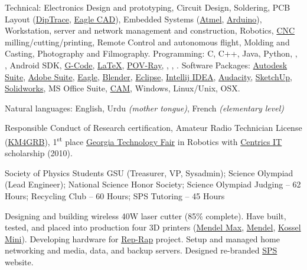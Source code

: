 \documentclass[10pt,a4paper]{article}
\begin{document}
\inlineheadsection  %
  {Technical:}
  {Electronics Design and prototyping, Circuit Design, Soldering, PCB Layout  (\href{http://diptrace.com/}{DipTrace}, \href{http://www.cadsoftusa.com/}{Eagle CAD}), Embedded Systems (\href{http://www.atmel.com/}{Atmel}, \href{http://www.arduino.cc/}{Arduino}), Workstation, server and network management and construction, Robotics, \href{http://en.wikipedia.org/wiki/Numerical_control}{CNC} milling/cutting/printing, Remote Control and autonomous flight, Molding and Casting, Photography and Filmography.
  }
  \vspace{0.5em}
  \inlineheadsection
  {Programming:}
  {C, C++, Java, Python, , , Android SDK, \href{http://en.wikipedia.org/wiki/G-code}{G-Code}, \href{http://www.latex-project.org}{\LaTeX}, \href{http://www.povray.org/}{POV-Ray}, , , .
  }
    \vspace{0.5em}
  \inlineheadsection
  {Software Packages:}
  {\href{http://www.autodesk.com/}{Autodesk Suite}, \href{http://www.adobe.com/}{Adobe Suite}, \href{http://www.cadsoftusa.com/}{Eagle}, \href{http://www.blender.org/}{Blender}, \href{https://www.eclipse.org/}{Eclipse}, \href{http://www.jetbrains.com/idea/}{Intellij IDEA}, \href{http://audacity.sourceforge.net/}{Audacity}, \href{http://www.sketchup.com/}{SketchUp}, \href{http://www.solidworks.com/}{Solidworks}, 
  MS Office Suite, \href{http://en.wikipedia.org/wiki/Computer-aided_manufacturing}{CAM},
  Windows,
  Linux/Unix,
  OSX.}
  
\vspace{0.5em}
\inlineheadsection
  {Natural languages:}
  {English, Urdu \emph{(mother tongue)}, French \emph{(elementary level)}}

\spacedhrule{1.6em}{-0.4em}

  {\href{https://www.citiprogram.org/}{} Responsible Conduct of Research certification, 
  	Amateur Radio Technician License (\href{http://wireless2.fcc.gov/UlsApp/UlsSearch/license.jsp?licKey=3657450}{KM4GRB}),
  1\textsuperscript{st} place \href{http://www.gatechfair.org/}{Georgia Technology Fair} in Robotics with \href{http://www.centricsit.com/}{Centrics IT} scholarship (2010).}
  
\spacedhrule{0.2em}{-0.4em}
  
	{Society of Physics Students GSU (Treasurer, VP, Sysadmin); Science Olympiad (Lead Engineer); National Science Honor Society; Science Olympiad Judging -- 62 Hours; Recycling Club -- 60 Hours; SPS Tutoring -- 45 Hours}

\spacedhrule{0.2em}{-0.4em}

{Designing and building wireless 40W laser cutter (85\% complete). Have built, tested, and placed into production four 3D printers (\href{http://reprap.org/wiki/MendelMax}{Mendel Max}, \href{http://reprap.org/wiki/Mendel}{Mendel}, \href{http://reprap.org/wiki/Kossel}{Kossel Mini}). Developing hardware for \href{http://reprap.org/wiki/RepRap}{Rep-Rap} project. Setup and managed home networking and media, data, and backup servers. Designed re-branded \href{http://spsgsu.org}{SPS} website.}
\end{document}
